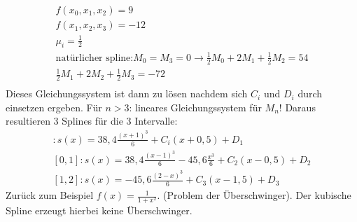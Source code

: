 \documentclass{scrartcl}
\begin{document}
\begin{align*}
f(x_0,x_1,x_2)=9\\
f(x_1,x_2,x_3)=-12\\
\mu_i = \frac{1}{2}\\
\text{natürlicher spline:} M_0=M_3=0
\rightarrow \frac{1}{2} M_0+2M_1+\frac{1}{2} M_2 =54 \\
\frac{1}{2} M_1+ 2 M_2 + \frac{1}{2} M_3 =-72 \\
\end{align*}
Dieses Gleichungssystem ist dann zu lösen nachdem sich $C_i$ und $D_i$ durch einsetzen ergeben.
Für $n>3$: lineares Gleichungssystem für $M_n$!
Daraus resultieren 3 Splines für die 3 Intervalle:
\begin{align*}
[-1,0]:s(x)=38,4 \frac{(x+1)^3}{6} + C_i(x+0,5)+D_1\\
[0,1]:s(x)=38,4 \frac{(x-1)^3}{6} - 45,6 \frac{x^3}{6}+C_2 (x-0,5)+D_2\\
[1,2]: s(x)=-45,6 \frac{(2-x)^3}{6}+C_3 (x-1,5)+ D_3
\end{align*}
Zurück zum Beispiel $f(x)=\frac{1}{1+x^2}$. (Problem der Überschwinger).
Der kubische Spline erzeugt hierbei keine Überschwinger.
\end{document}
